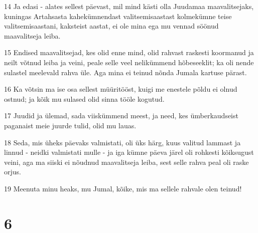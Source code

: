 \par 14 Ja edasi - alates sellest päevast, mil mind kästi olla Juudamaa maavalitsejaks, kuningas Artahsasta kahekümnendast valitsemisaastast kolmekümne teise valitsemisaastani, kaksteist aastat, ei ole mina ega mu vennad söönud maavalitseja leiba.
\par 15 Endised maavalitsejad, kes olid enne mind, olid rahvast raskesti koormanud ja neilt võtnud leiba ja veini, peale selle veel nelikümmend hõbeseeklit; ka oli nende sulastel meelevald rahva üle. Aga mina ei teinud nõnda Jumala kartuse pärast.
\par 16 Ka võtsin ma ise osa sellest müüritööst, kuigi me enestele põldu ei olnud ostnud; ja kõik mu sulased olid sinna tööle kogutud.
\par 17 Juudid ja ülemad, sada viiskümmend meest, ja need, kes ümberkaudseist paganaist meie juurde tulid, olid mu lauas.
\par 18 Seda, mis üheks päevaks valmistati, oli üks härg, kuus valitud lammast ja linnud - neidki valmistati mulle - ja iga kümne päeva järel oli rohkesti kõiksugust veini, aga ma siiski ei nõudnud maavalitseja leiba, sest selle rahva peal oli raske orjus.
\par 19 Meenuta minu heaks, mu Jumal, kõike, mis ma sellele rahvale olen teinud!

\chapter{6}

